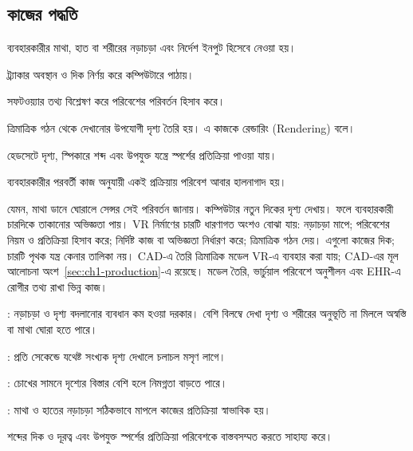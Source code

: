 \begin{topicbody}
\subsection{কাজের পদ্ধতি}
\begin{compactenum}
\item ব্যবহারকারীর মাথা, হাত বা শরীরের নড়াচড়া এবং নির্দেশ ইনপুট হিসেবে নেওয়া হয়।
\item ট্র্যাকার অবস্থান ও দিক নির্ণয় করে কম্পিউটারে পাঠায়।
\item সফটওয়্যার তথ্য বিশ্লেষণ করে পরিবেশের পরিবর্তন হিসাব করে।
\item ত্রিমাত্রিক গঠন থেকে দেখানোর উপযোগী দৃশ্য তৈরি হয়। এ কাজকে রেন্ডারিং (Rendering) বলে।
\item হেডসেটে দৃশ্য, স্পিকারে শব্দ এবং উপযুক্ত যন্ত্রে স্পর্শের প্রতিক্রিয়া পাওয়া যায়।
\item ব্যবহারকারীর পরবর্তী কাজ অনুযায়ী একই প্রক্রিয়ায় পরিবেশ আবার হালনাগাদ হয়।
\end{compactenum}
যেমন, মাথা ডানে ঘোরালে সেন্সর সেই পরিবর্তন জানায়। কম্পিউটার নতুন দিকের দৃশ্য দেখায়। ফলে ব্যবহারকারী চারদিকে তাকানোর অভিজ্ঞতা পায়।
VR নির্মাণের চারটি ধারণাগত অংশও বোঝা যায়:  নড়াচড়া মাপে;  পরিবেশের নিয়ম ও প্রতিক্রিয়া হিসাব করে;  নির্দিষ্ট কাজ বা অভিজ্ঞতা নির্ধারণ করে;  ত্রিমাত্রিক গঠন দেয়। এগুলো কাজের দিক; চারটি পৃথক যন্ত্র কেনার তালিকা নয়। CAD-এ তৈরি ত্রিমাত্রিক মডেল VR-এ ব্যবহার করা যায়; CAD-এর মূল আলোচনা অংশ~\ref{sec:ch1-production}-এ রয়েছে। মডেল তৈরি, ভার্চুয়াল পরিবেশে অনুশীলন এবং EHR-এ রোগীর তথ্য রাখা ভিন্ন কাজ।
\begin{compactpoints}
\item {}: নড়াচড়া ও দৃশ্য বদলানোর ব্যবধান কম হওয়া দরকার। বেশি বিলম্বে দেখা দৃশ্য ও শরীরের অনুভূতি না মিললে অস্বস্তি বা মাথা ঘোরা হতে পারে।
\item {}: প্রতি সেকেন্ডে যথেষ্ট সংখ্যক দৃশ্য দেখালে চলাচল মসৃণ লাগে।
\item {}: চোখের সামনে দৃশ্যের বিস্তার বেশি হলে নিমগ্নতা বাড়তে পারে।
\item {}: মাথা ও হাতের নড়াচড়া সঠিকভাবে মাপলে কাজের প্রতিক্রিয়া স্বাভাবিক হয়।
\item শব্দের দিক ও দূরত্ব এবং উপযুক্ত স্পর্শের প্রতিক্রিয়া পরিবেশকে বাস্তবসম্মত করতে সাহায্য করে।
\end{compactpoints}

\end{topicbody}
